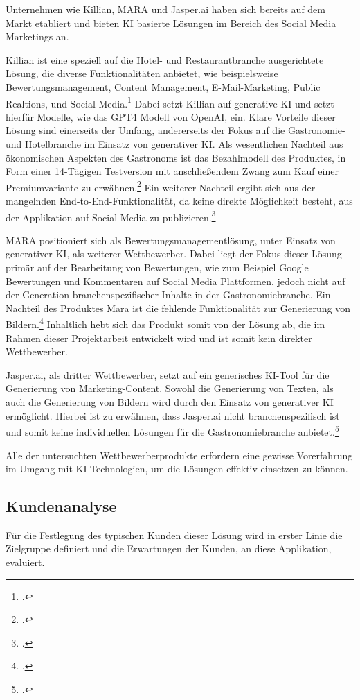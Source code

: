 Unternehmen wie Killian, MARA und Jasper.ai haben sich bereits auf dem Markt etabliert und bieten KI basierte Lösungen im Bereich des Social Media Marketings an.

Killian ist eine speziell auf die Hotel- und Restaurantbranche ausgerichtete Lösung, die diverse Funktionalitäten anbietet, wie beispielsweise Bewertungsmanagement, Content Management, E-Mail-Marketing, Public Realtions, und Social Media.\footcite{kilian_ai_produkt}
Dabei setzt Killian auf generative \ac{KI} und setzt hierfür Modelle, wie das GPT4 Modell von OpenAI, ein.
Klare Vorteile dieser Lösung sind einerseits der Umfang, andererseits der Fokus auf die Gastronomie- und Hotelbranche im Einsatz von generativer \ac{KI}.
Als wesentlichen Nachteil aus ökonomischen Aspekten des Gastronoms ist das Bezahlmodell des Produktes, in Form einer 14-Tägigen Testversion mit anschließendem Zwang zum Kauf einer Premiumvariante zu erwähnen.\footcite{kilian_ai_preise}
Ein weiterer Nachteil ergibt sich aus der mangelnden End-to-End-Funktionalität, da keine direkte Möglichkeit besteht, aus der Applikation auf Social Media zu publizieren.\footcite{kilian_ai_funktionen}

MARA positioniert sich als Bewertungsmanagementlösung, unter Einsatz von generativer \ac{KI}, als weiterer Wettbewerber.
Dabei liegt der Fokus dieser Lösung primär auf der Bearbeitung von Bewertungen, wie zum Beispiel Google Bewertungen und Kommentaren auf Social Media Plattformen, jedoch nicht auf der Generation branchenspezifischer Inhalte in der Gastronomiebranche.
Ein Nachteil des Produktes Mara ist die fehlende Funktionalität zur Generierung von Bildern.\footcite{mara_solutions_features}
Inhaltlich hebt sich das Produkt somit von der Lösung ab, die im Rahmen dieser Projektarbeit entwickelt wird und ist somit kein direkter Wettbewerber.

Jasper.ai, als dritter Wettbewerber, setzt auf ein generisches KI-Tool für die Generierung von Marketing-Content.
Sowohl die Generierung von Texten, als auch die Generierung von Bildern wird durch den Einsatz von generativer \ac{KI} ermöglicht.
Hierbei ist zu erwähnen, dass Jasper.ai nicht branchenspezifisch ist und somit keine individuellen Lösungen für die Gastronomiebranche anbietet.\footcite{jasper_ai_product_marketers}

Alle der untersuchten Wettbewerberprodukte erfordern eine gewisse Vorerfahrung im Umgang mit KI-Technologien, um die Lösungen effektiv einsetzen zu können.

\subsection{Kundenanalyse}
Für die Festlegung des typischen Kunden dieser Lösung wird in erster Linie die Zielgruppe definiert und die Erwartungen der Kunden, an diese Applikation, evaluiert.

